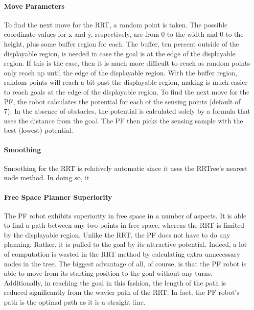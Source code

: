 \documentclass[12pt]{article}
\begin{document}
\paragraph*{Move Parameters}
To find the next move for the RRT, a random point is taken. The possible coordinate values for x and y, respectively, are from 0 to the width and 0 to the height, plus some buffer region for each. The buffer, ten percent outside of the displayable region, is needed in case the goal is at the edge of the displayable region. If this is the case, then it is much more difficult to reach as random points only reach up until the edge of the displayable region. With the buffer region, random points will reach a bit past the displayable region, making is much easier to reach goals at the edge of the displayable region.
To find the next move for the PF, the robot calculates the potential for each of the sensing points (default of 7). In the absence of obstacles, the potential is calculated solely by a formula that uses the distance from the goal. The PF then picks the sensing sample with the best (lowest) potential.
\paragraph*{Smoothing}
Smoothing for the RRT is relatively automatic since it uses the RRTree's nearest node method. In doing so, it 
\paragraph*{Free Space Planner Superiority}
The PF robot exhibits superiority in free space in a number of aspects. It is able to find a path between any two points in free space, whereas the RRT is limited by the displayable region. Unlike the RRT, the PF does not have to do any planning. Rather, it is pulled to the goal by its attractive potential. Indeed, a lot of computation is wasted in the RRT method by calculating extra unnecessary nodes in the tree. The biggest advantage of all, of course, is that the PF robot is able to move from its starting position to the goal without any turns. Additionally, in reaching the goal in this fashion, the length of the path is reduced significantly from the wavier path of the RRT. In fact, the PF robot's path is the optimal path as it is a straight line.
\end{document}
